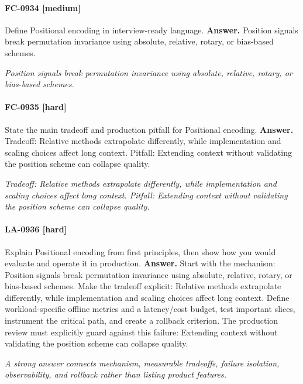 \paragraph{FC-0934 [medium]} Define Positional encoding in interview-ready language.
\noindent\textbf{Answer.} Position signals break permutation invariance using absolute, relative, rotary, or bias-based schemes.
\par\textit{Position signals break permutation invariance using absolute, relative, rotary, or bias-based schemes.}
\paragraph{FC-0935 [hard]} State the main tradeoff and production pitfall for Positional encoding.
\noindent\textbf{Answer.} Tradeoff: Relative methods extrapolate differently, while implementation and scaling choices affect long context. Pitfall: Extending context without validating the position scheme can collapse quality.
\par\textit{Tradeoff: Relative methods extrapolate differently, while implementation and scaling choices affect long context. Pitfall: Extending context without validating the position scheme can collapse quality.}
\paragraph{LA-0936 [hard]} Explain Positional encoding from first principles, then show how you would evaluate and operate it in production.
\noindent\textbf{Answer.} Start with the mechanism: Position signals break permutation invariance using absolute, relative, rotary, or bias-based schemes. Make the tradeoff explicit: Relative methods extrapolate differently, while implementation and scaling choices affect long context. Define workload-specific offline metrics and a latency/cost budget, test important slices, instrument the critical path, and create a rollback criterion. The production review must explicitly guard against this failure: Extending context without validating the position scheme can collapse quality.
\par\textit{A strong answer connects mechanism, measurable tradeoffs, failure isolation, observability, and rollback rather than listing product features.}
